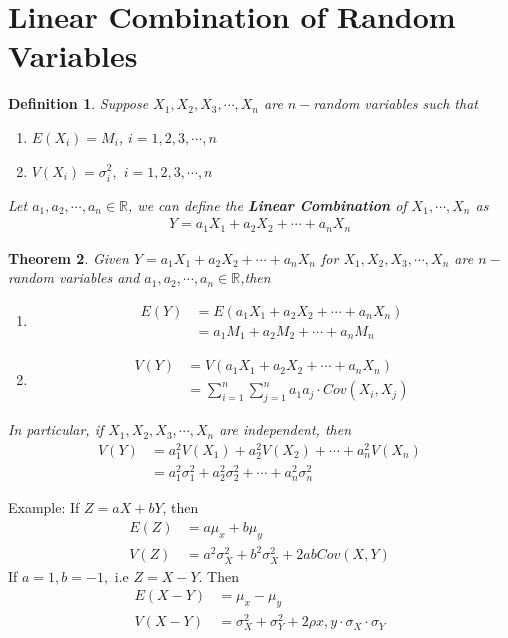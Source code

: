 \documentclass[11pt,oneside]{book}
\theoremstyle{newStyle}
\newtheorem{thm}{Theorem}[chapter]
\newtheorem{defn}[thm]{Definition}
\newcommand{\R}{\mathbb{R}}
\newcommand{\example}{\color{purple}Example: \color{black}}
\begin{document}
\section[Linear Combination of Random Variables]{Linear Combination of Random Variables}
\begin{defn}
Suppose $X_1,X_2,X_3,\cdots,X_n$ are $n-$random variables such that \begin{enumerate}[label=(\roman*)]
\item $E(X_i)=M_i$, $i=1,2,3,\cdots,n$
\item $V(X_i)=\sigma_i^2,$ $i=1,2,3,\cdots,n$
\end{enumerate}
Let $a_1,a_2,\cdots,a_n\in \R$, we can define the \textbf{Linear Combination} of $X_1,\cdots,X_n$ as \begin{align*}
Y=a_1X_1+a_2X_2+\cdots+a_nX_n
\end{align*}
\end{defn}
\begin{thm}
Given $Y=a_1X_1+a_2X_2+\cdots+a_nX_n$ for $X_1,X_2,X_3,\cdots,X_n$ are $n-$random variables and $a_1,a_2,\cdots,a_n\in \R$,then
\begin{enumerate}
\item \begin{align*}
E(Y)&=E(a_1X_1+a_2X_2+\cdots+a_nX_n)\\
&=a_1M_1+a_2M_2+\cdots+a_nM_n
\end{align*}
\item \begin{align*}
V(Y)&=V(a_1X_1+a_2X_2+\cdots+a_nX_n)\\
&=\sum_{i=1}^n\sum_{j=1}^na_1a_j\cdot Cov(X_i,X_j)
\end{align*}
\end{enumerate}
In particular, if $X_1,X_2,X_3,\cdots,X_n$ are independent, then \begin{align*}
V(Y)&=a_1^2V(X_1)+a_2^2V(X_2)+\cdots+a_n^2V(X_n)\\
&=a_1^2\sigma_1^2+a_2^2\sigma_2^2+\cdots +a_n^2\sigma_n^2
\end{align*}
\end{thm}
\example If $Z=aX+bY$, then \begin{align*}
E(Z)&=a\mu_x+b\mu_y\\
V(Z)&=a^2\sigma_X^2+b^2\sigma_X^2+2abCov(X,Y)
\end{align*}
If $a=1, b=-1,$ i.e $Z=X-Y$. Then \begin{align*}
E(X-Y)&=\mu_x-\mu_y\\
V(X-Y)&=\sigma_X^2+\sigma_Y^2+2\rho{x,y}\cdot \sigma_X\cdot \sigma_Y
\end{align*}
\end{document}
